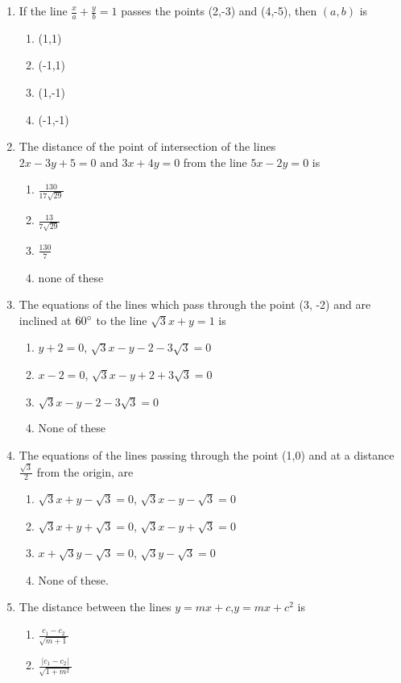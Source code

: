 \documentclass[12pt]{article}
\providecommand{\abs}[1]{\left\vert#1\right\vert}
\begin{document}
\begin{enumerate}[resume]
\begin{enumerate}
\end{enumerate}
\item If the line $\frac{x}{a}+\frac{y}{b}=1$ passes the points (2,-3) and (4,-5), then $(a,b)$ is 
\begin{enumerate}
\item (1,1)
\item (-1,1)
\item (1,-1)
\item (-1,-1)
\end{enumerate}
\item The distance of the point of intersection of the lines $2x-3y+5=0 \text{ and }3x+4y=0$ from the line $5x-2y=0$ is
\begin{enumerate}
\item $\frac{130}{17\sqrt{29}}$
\item $\frac{13}{7\sqrt{29}}$
\item $\frac{130}{7}$
\item none of these
\end{enumerate}
\item The equations of the lines which pass through the point (3, -2) and are inclined at $60\degree$ to the line $\sqrt{3} x+y=1$ is
\begin{enumerate}
\item $y+2=0$, $\sqrt{3}x-y-2-3\sqrt{3}=0$
\item $x-2=0$, $\sqrt{3}x-y+2+3\sqrt{3}=0$
\item $\sqrt{3}x-y-2-3\sqrt{3}=0$
\item None of these
\end{enumerate}
\item The equations of the lines passing through the point (1,0) and at a distance $\frac{\sqrt{3}}{2}$ from the origin, are 
\begin{enumerate}
\item $\sqrt{3}x+y-\sqrt{3}=0$, $\sqrt{3}x-y-\sqrt{3}=0$
\item $\sqrt{3}x+y+\sqrt{3}=0$, $\sqrt{3}x-y+\sqrt{3}=0$
\item $x+\sqrt{3}y-\sqrt{3}=0$, $\sqrt{3}y-\sqrt{3}=0$
\item None of these.
\end{enumerate}
\item The distance between the lines $y=mx+c$,$y=mx+c^2$ is
\begin{enumerate}
\item $\frac{c_1-c_2}{\sqrt{m+1}}$
\item $\frac{\abs{c_1-c_2}}{\sqrt{1+m^2}}$

\end{enumerate}
\end{enumerate}
\end{document}
